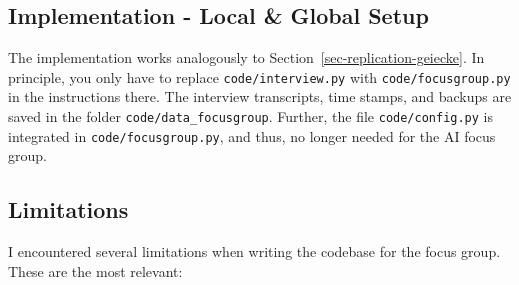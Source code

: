 \documentclass[
  letterpaper,
  DIV=11,
  numbers=noendperiod]{scrartcl}
\begin{document}
\subsection{Implementation - Local \& Global
Setup}\label{sec-focusgroup-implementation}

The implementation works analogously to
Section~\ref{sec-replication-geiecke}. In principle, you only have to
replace \texttt{code/interview.py} with \texttt{code/focusgroup.py} in
the instructions there. The interview transcripts, time stamps, and
backups are saved in the folder \texttt{code/data\_focusgroup}. Further,
the file \texttt{code/config.py} is integrated in
\texttt{code/focusgroup.py}, and thus, no longer needed for the AI focus
group.

\subsection{Limitations}\label{sec-focusgroup-limitations}

I encountered several limitations when writing the codebase for the
focus group. These are the most relevant:
\end{document}
